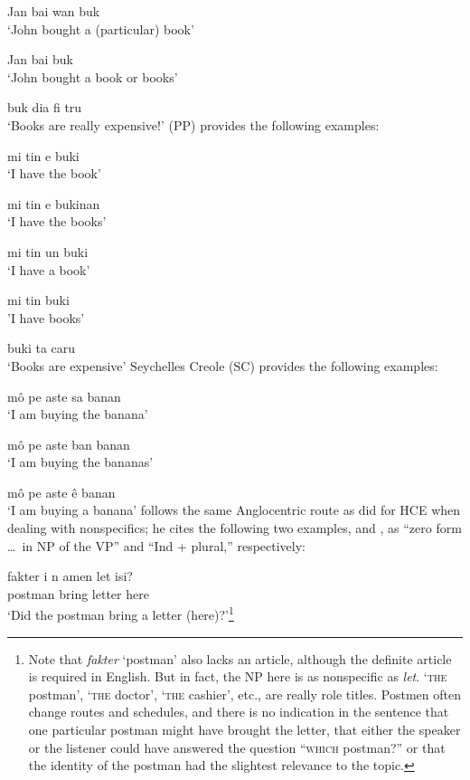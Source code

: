\ea\label{ex:2:14}
 Jan bai wan buk\\
\glt `John bought a (particular) book'
\z


\ea\label{ex:2:15}
Jan bai buk\\
\glt `John bought a book or books'
\z

\ea\label{ex:2:16}
 buk dia fi tru\\
\glt `Books are really expensive!'
\z
 (PP) provides the following examples:

\ea\label{ex:2:17}
mi tin e buki\\
\glt `I have the book'
\z

\ea\label{ex:2:18}
mi tin e bukinan \\
\glt `I have the books'
\z

\ea\label{ex:2:19}
mi tin un buki\\
\glt `I have a book'
\z

\ea\label{ex:2:20}
mi tin buki\\
\glt  'I have books'
\z

\ea\label{ex:2:21}
buki ta caru \\
\glt `Books are expensive'
\z
Seychelles Creole (SC) provides the following examples:

\ea\label{ex:2:22}
 m\^o pe aste sa banan \\
\glt `I am buying the banana'
\z

\ea\label{ex:2:23}
m\^o pe aste ban banan\\
\glt `I am buying the bananas'
\z

\ea\label{ex:2:24}
 m\^o pe aste \^e banan\\
\glt `I am buying a banana'
\z
\citet[13]{Corne1977} follows the same Anglocentric route as \citet{Perlman1973} did for HCE when dealing with nonspecifics; he cites the following two examples,  and , as ``zero form \ldots~in NP of the VP'' and ``Ind + plural,'' respectively:

\ea\label{ex:2:25}
\gll fakter i n amen let isi?\\
postman {\PM} {\COMP} bring letter here\\
\glt `Did the postman bring a letter (here)?'\footnote{Note that \textit{fakter} `postman' also lacks an article, although the definite article is required in English. But in fact, the NP here is as nonspecific as \textit{let}. `\textsc{the} postman', `\textsc{the} doctor', `\textsc{the} cashier', etc., are really role titles. Postmen often change routes and schedules, and there is no indication in the sentence that one particular postman might have brought the letter, that either the speaker or the listener could have answered the question ``\textsc{which} postman?'' or that the identity of the postman had the slightest relevance to the topic.}
\z

